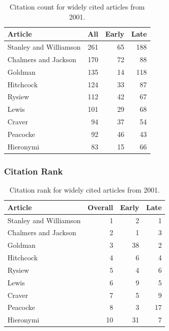 \documentclass[
  10pt,
  letterpaper,
  DIV=11,
  numbers=noendperiod,
  twoside]{scrartcl}
\begin{document}
\begin{longtable}[]{@{}lrrr@{}}

\caption{\label{tbl-citation-count-2001}Citation count for widely cited
articles from 2001.}

\tabularnewline

\toprule\noalign{}
Article & All & Early & Late \\
\midrule\noalign{}
\endhead
\bottomrule\noalign{}
\endlastfoot
Stanley and Williamson & 261 & 65 & 188 \\
Chalmers and Jackson & 170 & 72 & 88 \\
Goldman & 135 & 14 & 118 \\
Hitchcock & 124 & 33 & 87 \\
Rysiew & 112 & 42 & 67 \\
Lewis & 101 & 29 & 68 \\
Craver & 94 & 37 & 54 \\
Peacocke & 92 & 46 & 43 \\
Hieronymi & 83 & 15 & 66 \\

\end{longtable}

\subsubsection*{Citation Rank}\label{citation-rank-25}

\begin{longtable}[]{@{}lrrr@{}}

\caption{\label{tbl-citation-rank-2001}Citation rank for widely cited
articles from 2001.}

\tabularnewline

\toprule\noalign{}
Article & Overall & Early & Late \\
\midrule\noalign{}
\endhead
\bottomrule\noalign{}
\endlastfoot
Stanley and Williamson & 1 & 2 & 1 \\
Chalmers and Jackson & 2 & 1 & 3 \\
Goldman & 3 & 38 & 2 \\
Hitchcock & 4 & 6 & 4 \\
Rysiew & 5 & 4 & 6 \\
Lewis & 6 & 9 & 5 \\
Craver & 7 & 5 & 9 \\
Peacocke & 8 & 3 & 17 \\
Hieronymi & 10 & 31 & 7 \\

\end{longtable}
\end{document}
